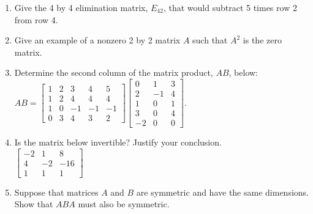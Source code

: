 \documentclass[11pt]{amsart}
\begin{document}
\begin{enumerate}
\begin{enumerate}
\begin{enumerate}
		\item an infinite number of solutions.\\
		
		\end{enumerate}
	\item Give the 4 by 4 elimination matrix, $E_{42}$, that would subtract 5 times row 2 from row 4.
	\vfill
	\item Give an example of a nonzero 2 by 2 matrix $A$ such that $A^2$ is the zero matrix.
	\vfill 
	\newpage
	
	\item Determine the second column of the matrix product, $AB$, below:\\ 
	$AB=\begin{bmatrix}1&2&3&4&5\\1&2&4&4&4\\1&0&-1&-1&-1\\0&3&4&3&2\end{bmatrix} \begin{bmatrix} 0&1&3\\ 2&-1&4\\1&0&1\\3&0&4\\-2&0&0 \end{bmatrix}$.
	\vfill
	\item Is the matrix below invertible? Justify your conclusion.\\
	
	$\begin{bmatrix} -2&1 &8 \\ 4&-2&-16\\1&1&1 \end{bmatrix}$
	
	\vfill
	\item Suppose that matrices $A$ and $B$ are symmetric and have the same dimensions. Show that $ABA$ must also be symmetric. 
	\vfill
	\end{enumerate}
\end{enumerate}
\end{document}
